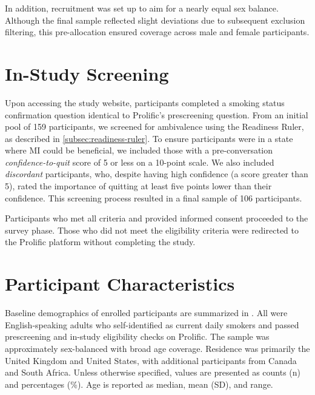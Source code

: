 In addition, recruitment was set up to aim for a nearly equal sex balance. Although the final sample reflected slight deviations due to subsequent exclusion filtering, this pre-allocation ensured coverage across male and female participants.

\section{In-Study Screening}
Upon accessing the study website, participants completed a smoking status confirmation question identical to Prolific's prescreening question. From an initial pool of 159 participants, we screened for ambivalence using the Readiness Ruler, as described in \cref{subsec:readiness-ruler}. To ensure participants were in a state where MI could be beneficial, we included those with a pre-conversation \emph{confidence-to-quit} score of 5 or less on a 10-point scale. We also included \emph{discordant}
participants, who, despite having high confidence (a score greater than 5), rated the importance of quitting at least five points lower than their confidence. This screening process resulted in a final sample of 106 participants.

Participants who met all criteria and provided informed consent proceeded to the survey phase. Those who did not meet the eligibility criteria were redirected to the Prolific platform without completing the study.

\section{Participant Characteristics}
\label{subsec:participant-characteristics}
\noindent Baseline demographics of enrolled participants are summarized in . All were English-speaking adults who self-identified as current daily smokers and passed prescreening and in-study eligibility checks on Prolific. The sample was approximately sex-balanced with broad age coverage. Residence was primarily the United Kingdom and United States, with additional participants from Canada and South Africa. Unless otherwise specified, values are presented as counts (n) and percentages (\%). Age is reported as median, mean (SD), and range.

